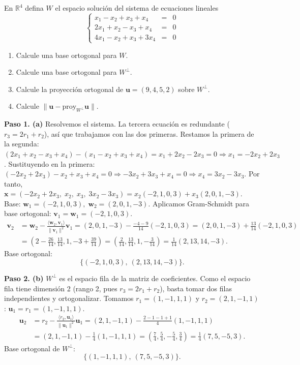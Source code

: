 \begin{prob}
En $\mathbb{R}^4$ defina $W$ el espacio solución del sistema de ecuaciones lineales
\[
\left\lbrace
\begin{array}{ccc}
x_1-x_2+x_3+x_4&=&0\\
2x_1+x_2-x_3+x_4&=&0\\
4x_1-x_2+x_3+3x_4&=&0
\end{array}
\right.
\]
\begin{enumerate}
\item Calcule una base ortogonal para $W$.
\item Calcule una base ortogonal para $W^{\perp}$.
\item Calcule la proyección ortogonal de $\mathbf{u}=(9,4,5,2)$ sobre $W^{\perp}$.
\item Calcule $\lVert \mathbf{u}-\text{proy}_{W^{\perp}}\mathbf{u}\rVert$.
\end{enumerate}
\begin{myproof}
\textbf{Paso 1. (a)} Resolvemos el sistema. La tercera ecuación es redundante ($r_3 = 2r_1 + r_2$), así que trabajamos con las dos primeras. Restamos la primera de la segunda: \( (2x_1+x_2-x_3+x_4) - (x_1-x_2+x_3+x_4) = x_1+2x_2-2x_3 = 0 \Rightarrow x_1 = -2x_2+2x_3 \).
Sustituyendo en la primera: \( (-2x_2+2x_3) - x_2 + x_3 + x_4 = 0 \Rightarrow -3x_2+3x_3+x_4=0 \Rightarrow x_4 = 3x_2-3x_3 \).  
Por tanto, \( \mathbf{x} = (-2x_2+2x_3,\; x_2,\; x_3,\; 3x_2-3x_3) = x_2(-2,1,0,3) + x_3(2,0,1,-3) \).  
Base: \( \mathbf{w}_1 = (-2,1,0,3),\; \mathbf{w}_2 = (2,0,1,-3) \).  
Aplicamos Gram-Schmidt para base ortogonal:
\( \mathbf{v}_1 = \mathbf{w}_1 = (-2,1,0,3) \).
\[
\begin{aligned}
\mathbf{v}_2 &= \mathbf{w}_2 - \frac{\langle \mathbf{w}_2, \mathbf{v}_1 \rangle}{\|\mathbf{v}_1\|^2}\mathbf{v}_1
= (2,0,1,-3) - \frac{-4-9}{14}(-2,1,0,3)
= (2,0,1,-3) + \frac{13}{14}(-2,1,0,3)\\
&= \left(2-\frac{26}{14}, \frac{13}{14}, 1, -3+\frac{39}{14}\right)
= \left(\frac{2}{14}, \frac{13}{14}, 1, -\frac{3}{14}\right)
= \frac{1}{14}(2,13,14,-3).
\end{aligned}
\]
Base ortogonal:
\[
\boxed{\{(-2,1,0,3),\ (2,13,14,-3)\}}.
\]

\textbf{Paso 2. (b)} \( W^\perp \) es el espacio fila de la matriz de coeficientes. Como el espacio fila tiene dimensión 2 (rango 2, pues $r_3 = 2r_1 + r_2$), basta tomar dos filas independientes y ortogonalizar. Tomamos \( r_1=(1,-1,1,1) \) y \( r_2=(2,1,-1,1) \):
\( \mathbf{u}_1 = r_1 = (1,-1,1,1) \).
\[
\begin{aligned}
\mathbf{u}_2 &= r_2 - \frac{\langle r_2, \mathbf{u}_1 \rangle}{\|\mathbf{u}_1\|^2}\mathbf{u}_1
= (2,1,-1,1) - \frac{2-1-1+1}{4}(1,-1,1,1)\\
&= (2,1,-1,1) - \frac{1}{4}(1,-1,1,1)
= \left(\frac{7}{4}, \frac{5}{4}, -\frac{5}{4}, \frac{3}{4}\right)
= \frac{1}{4}(7,5,-5,3).
\end{aligned}
\]
Base ortogonal de \( W^\perp \):
\[
\boxed{\{(1,-1,1,1),\ (7,5,-5,3)\}}.
\]


\end{myproof}
\end{prob}
